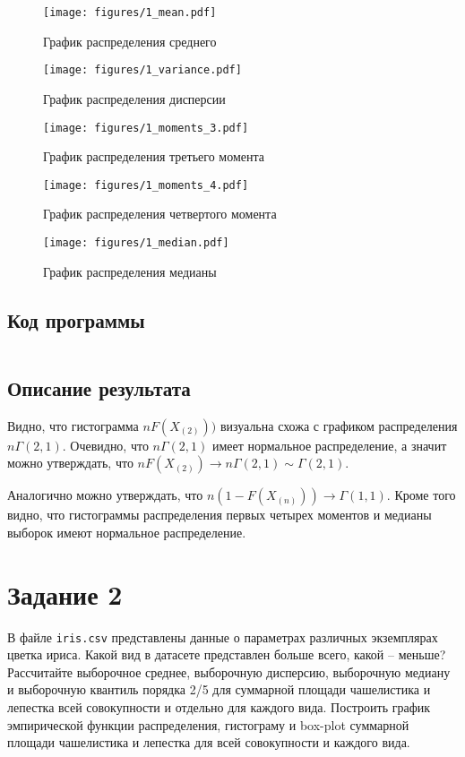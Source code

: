 \begin{figure}[H]
  \centering
    \texttt{[image: figures/1\_mean.pdf]}
  \caption{График распределения среднего}\label{fig:1_mean}
\end{figure}


\begin{figure}[H]
  \centering
    \texttt{[image: figures/1\_variance.pdf]}
  \caption{График распределения дисперсии}\label{fig:1_variance}
\end{figure}


\begin{figure}[H]
  \centering
    \texttt{[image: figures/1\_moments\_3.pdf]}
  \caption{График распределения третьего момента}\label{fig:1_moments_3}
\end{figure}


\begin{figure}[H]
  \centering
    \texttt{[image: figures/1\_moments\_4.pdf]}
  \caption{График распределения четвертого момента}\label{fig:1_moments_4}
\end{figure}


\begin{figure}[H]
  \centering
    \texttt{[image: figures/1\_median.pdf]}
  \caption{График распределения медианы}\label{fig:1_median}
\end{figure}

\subsection{Код программы}
\inputminted[breaklines,linenos]{Python}{py/task1.py}

\subsection{Описание результата}
Видно, что гистограмма \(n F(X_{(2)}))\) визуальна схожа
с графиком распределения \(n \Gamma(2,1)\).
Очевидно, что \(n \Gamma(2,1)\) имеет нормальное распределение,
а значит можно утверждать, что \(n F(X_{(2)}) \to n \Gamma(2,1) \sim \Gamma(2,1)\).

Аналогично можно утверждать, что \( n(1 - F(X_{(n)})) \to \Gamma(1,1) \).
Кроме того видно, что гистограммы распределения первых четырех моментов и
медианы выборок имеют нормальное распределение.

\section{Задание 2}
В файле \texttt{iris.csv} представлены данные о параметрах различных
экземплярах цветка ириса.
Какой вид в датасете представлен больше всего, какой -- меньше?
Рассчитайте выборочное среднее, выборочную дисперсию,
выборочную медиану и выборочную квантиль порядка 2/5 для
суммарной площади чашелистика и лепестка всей совокупности и
отдельно для каждого вида.
Построить график эмпирической функции распределения, гистограму
и box-plot суммарной площади чашелистика и лепестка для всей
совокупности и каждого вида.


